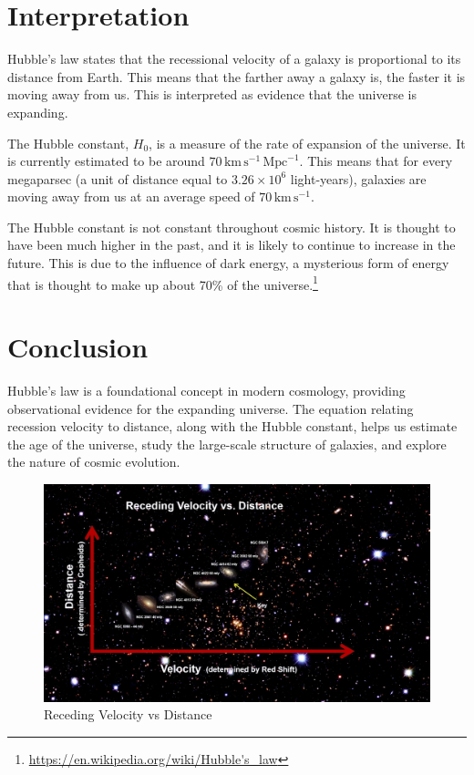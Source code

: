 \documentclass{article}
\begin{document}
\section{Interpretation}
Hubble's law states that the recessional velocity of a galaxy is proportional to its distance from Earth. This means that the farther away a galaxy is, the faster it is moving away from us. This is interpreted as evidence that the universe is expanding.

The Hubble constant, $H_0$, is a measure of the rate of expansion of the universe. It is currently estimated to be around $70 \, \text{km} \, \text{s}^{-1} \, \text{Mpc}^{-1}$. This means that for every megaparsec (a unit of distance equal to $3.26 \times 10^{6}$ light-years), galaxies are moving away from us at an average speed of $70 \, \text{km} \, \text{s}^{-1}$.

The Hubble constant is not constant throughout cosmic history. It is thought to have been much higher in the past, and it is likely to continue to increase in the future. This is due to the influence of dark energy, a mysterious form of energy that is thought to make up about 70\% of the universe.\footnote{\url{https://en.wikipedia.org/wiki/Hubble's_law}}

\section{Conclusion}
Hubble's law is a foundational concept in modern cosmology, providing observational evidence for the expanding universe. The equation relating recession velocity to distance, along with the Hubble constant, helps us estimate the age of the universe, study the large-scale structure of galaxies, and explore the nature of cosmic evolution.
\begin{figure}[h]
\begin{center}

\includegraphics[width=0.7 \textwidth]{maxresdefault.jpg}
\caption{Receding Velocity vs Distance}
\end{center}
\end{figure}
\end{document}

